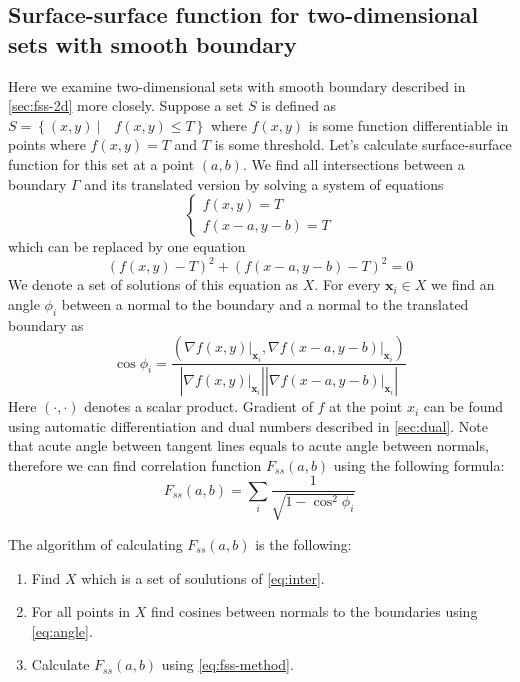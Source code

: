 \documentclass[reprint,amsmath,amssymb,aps,pre,showkeys,showpacs]{revtex4-1}
\begin{document}
\subsection{Surface-surface function for two-dimensional sets with smooth boundary}
\label{sec:cool-algo}
Here we examine two-dimensional sets with smooth boundary described in
\cref{sec:fss-2d} more closely. Suppose a set $S$ is defined as
$S = \left\{ (x, y) \ | \quad f(x, y) \le T \right\}$ where $f(x, y)$ is some function
differentiable in points where $f(x, y) = T$ and $T$ is some threshold. Let's
calculate surface-surface function for this set at a point $(a, b)$. We find all
intersections between a boundary $\Gamma$ and its translated version by solving a
system of equations
\begin{equation*}
  \left\{
  \begin{array}{l}
    f(x, y) = T \\
    f(x-a, y-b) = T    
  \end{array}
  \right.
\end{equation*}
which can be replaced by one equation
\begin{equation}
  (f(x, y) - T)^2 + (f(x-a, y-b) - T)^2 = 0 \label{eq:inter}
\end{equation}
We denote a set of solutions of this equation as $X$. For every $\bm{x}_i \in X$
we find an angle $\phi_i$ between a normal to the boundary and a normal to
the translated boundary as
\begin{equation}
  \cos \phi_i = \frac{(\nabla f(x,y) \vert_{\bm{x}_i}, \nabla f(x-a,y-b)
    \vert_{\bm{x}_i})}{|\nabla f(x,y) \vert_{\bm{x}_i}| |\nabla f(x-a,y-b)
    \vert_{\bm{x}_i}|} \label{eq:angle}
\end{equation}
Here $(\cdot, \cdot)$ denotes a scalar product. Gradient of $f$ at the point
$x_i$ can be found using automatic differentiation and dual numbers described in
\cref{sec:dual}. Note that acute angle between tangent lines equals to acute
angle between normals, therefore we can find correlation function $F_{ss}(a, b)$
using the following formula:
\begin{equation}
  F_{ss}(a, b) = \sum_i \frac{1}{\sqrt{1 - \cos^2 \phi_i}} \label{eq:fss-method}
\end{equation}

The algorithm of calculating $F_{ss}(a, b)$ is the following:
\begin{enumerate}
\item Find $X$ which is a set of soulutions of \cref{eq:inter}.
\item For all points in $X$ find cosines between normals to the boundaries using
  \cref{eq:angle}.
\item Calculate $F_{ss}(a, b)$ using \cref{eq:fss-method}.
\end{enumerate}
\end{document}
